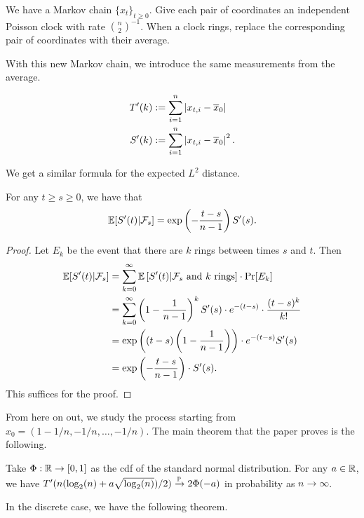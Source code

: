 \documentclass[12pt]{article}
\begin{document}
\begin{defn}
	We have a Markov chain $\{x_t\}_{t \geq 0}$. Give each pair of coordinates an independent Poisson clock with rate $\binom{n}{2}^{-1}$. When a clock rings, replace the corresponding pair of coordinates with their average. 
\end{defn}

With this new Markov chain, we introduce the same measurements from the average. 

\begin{align*}
	T'(k) & := \sum_{i = 1}^n \left | x_{t, i} - \overline{x}_0 \right | \\
	S'(k) & := \sum_{i = 1}^n \left | x_{t, i} - \overline{x}_0 \right |^2.
\end{align*}

We get a similar formula for the expected $L^2$ distance. 

\begin{prop}
	For any $t \geq s \geq 0$, we have that 
	\[
		\mathbb{E}[S'(t) | \mathcal{F}_s ] = \exp \left ( - \frac{t-s}{n-1} \right ) S'(s).	
	\]
\end{prop}
\begin{proof}
	Let $E_k$ be the event that there are $k$ rings between times $s$ and $t$. Then 
	\begin{align*}
		\mathbb{E} [ S'(t) | \mathcal{F}_s ] & = \sum_{k = 0}^\infty \mathbb{E} \left [ S'(t) | \mathcal{F}_s \text{ and $k$ rings} \right ] \cdot \Pr[E_k] \\
		& = \sum_{k = 0}^\infty \left ( 1 - \frac{1}{n-1} \right )^k S'(s) \cdot e^{-(t-s)} \cdot \frac{(t-s)^k}{k!} \\
		& = \exp \left (  (t-s) \left ( 1 - \frac{1}{n-1} \right ) \right ) \cdot e^{-(t-s)} S'(s) \\
		& = \exp \left ( - \frac{t-s}{n-1} \right ) \cdot S'(s). 
	\end{align*}
	This suffices for the proof. 
\end{proof}

From here on out, we study the process starting from $x_0 = (1 - 1/n, -1/n, \ldots, -1/n)$. The main theorem that the paper proves is the following. 

\begin{thm} \label{main_theorem_continuous}
	Take $\Phi : \mathbb{R} \to [0, 1]$ as the cdf of the standard normal distribution. For any $a \in \mathbb{R}$, we have $T'(n (\log_2(n) +a \sqrt{\log_2(n)})/2) \xrightarrow[]{\mathbb{P}} 2 \Phi(-a)$ in probability as $n \to \infty$. 
\end{thm}

In the discrete case, we have the following theorem. 
\end{document}
